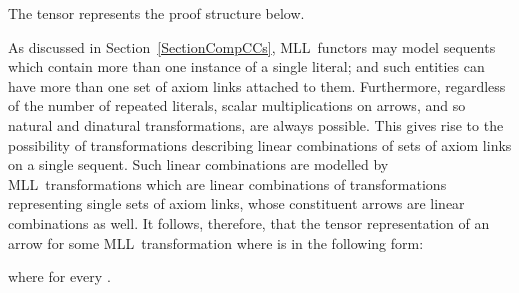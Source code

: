 \documentclass{LMCS}
\theoremstyle{plain}\newtheorem*{cLm}{Claim}
\newcommand{\mll}{MLL} \newcommand{\mall}{MALL}
\begin{document}
\begin{exa}
The tensor  represents the proof structure below.
\end{exa} 
\begin{center} \vspace{5mm}
 \vspace{5mm}
\end{center}

As discussed in Section~\ref{SectionCompCCs}, \mll~functors may model sequents which contain more than one instance of a single literal; and such entities can have more than one set of axiom links attached to them. Furthermore, regardless of the number of repeated literals, scalar multiplications on arrows, and so natural and dinatural transformations, are always possible. This gives rise to the possibility of transformations describing linear combinations of sets of axiom links on a single sequent. Such linear combinations are modelled by \mll~transformations which are linear combinations of transformations representing single sets of axiom links, whose constituent arrows are linear combinations as well. It follows, therefore, that the tensor representation of an arrow  for some \mll~transformation  where  is in the following form:

where  for every .
\end{document}
